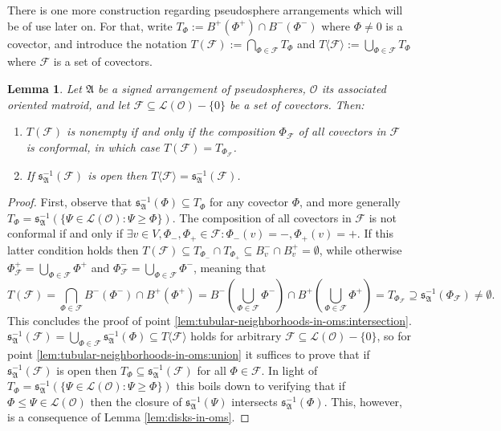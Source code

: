 \documentclass[a4paper,11pt,reqno, english]{amsart}
\newtheorem{lemma}[theorem]{Lemma}
\theoremstyle{definition}
\theoremstyle{remark}
\begin{document}
There is one more construction regarding pseudosphere arrangements which will be of use later on. For that, write $T_\Phi:=B^+(\Phi^+)\cap B^-(\Phi^-)$ where $\Phi\neq 0$ is a covector, and introduce the notation $T(\mathscr{F}):=\bigcap_{\Phi\in\mathscr{F}}T_\Phi$ and $T\langle\mathscr{F}\rangle:=\bigcup_{\Phi\in\mathscr{F}}T_\Phi$ where $\mathscr{F}$ is a set of covectors.
\begin{lemma}\label{lem:tubular-neighborhoods-in-oms}
    Let $\mathfrak{A}$ be a signed arrangement of pseudospheres, $\mathscr{O}$ its associated oriented matroid, and let $\mathscr{F}\subseteq\mathscr{L}(\mathscr{O})-\{0\}$ be a set of covectors. Then:
    \begin{enumerate}[label=\normalfont{(\arabic*)}]
        \item\label{lem:tubular-neighborhoods-in-oms:intersection} $T(\mathscr{F})$ is nonempty if and only if the composition $\Phi_\mathscr{F}$ of all covectors in $\mathscr{F}$ is conformal, in which case $T(\mathscr{F})=T_{\Phi_\mathscr{F}}$.
        \item\label{lem:tubular-neighborhoods-in-oms:union} If $\mathfrak{s}_\mathfrak{A}^{-1}(\mathscr{F})$ is open then $T\langle \mathscr{F}\rangle=\mathfrak{s}_\mathfrak{A}^{-1}(\mathscr{F})$.
    \end{enumerate} 
\end{lemma}
\begin{proof}
    First, observe that $\mathfrak{s}_\mathfrak{A}^{-1}(\Phi)\subseteq T_\Phi$ for any covector $\Phi$, and more generally $T_\Phi=\mathfrak{s}_\mathfrak{A}^{-1}(\{\Psi\in\mathscr{L}(\mathscr{O}):\Psi\geq\Phi\})$. The composition of all covectors in $\mathscr{F}$ is not conformal if and only if $\exists v\in V, \Phi_-,\Phi_+\in\mathscr{F}\colon\Phi_-(v)=-,\Phi_+(v)=+$. If this latter condition holds then $T(\mathscr{F})\subseteq T_{\Phi_-}\cap T_{\Phi_+}\subseteq B^-_v\cap B^+_v=\emptyset$, while otherwise $\Phi_\mathscr{F}^+=\bigcup_{\Phi\in\mathscr{F}}\Phi^+$ and $\Phi_\mathscr{F}^-=\bigcup_{\Phi\in\mathscr{F}}\Phi^-$, meaning that 
    \[
        T(\mathscr{F})=\bigcap_{\Phi\in\mathscr{F}}B^-(\Phi^-)\cap B^+(\Phi^+)=B^-(\bigcup_{\Phi\in\mathscr{F}}\Phi^-)\cap B^+(\bigcup_{\Phi\in\mathscr{F}}\Phi^+)=T_{\Phi_{\mathscr{F}}}\supseteq\mathfrak{s}_\mathfrak{A}^{-1}(\Phi_{\mathscr{F}})\neq\emptyset.
    \]
    This concludes the proof of point \ref{lem:tubular-neighborhoods-in-oms:intersection}. $\mathfrak{s}_\mathfrak{A}^{-1}(\mathscr{F})=\bigcup_{\Phi\in\mathscr{F}}\mathfrak{s}_\mathfrak{A}^{-1}(\Phi)\subseteq T\langle\mathscr{F}\rangle$ holds for arbitrary $\mathscr{F}\subseteq\mathscr{L}(\mathscr{O})-\{0\}$, so for point \ref{lem:tubular-neighborhoods-in-oms:union} it suffices to prove that if $\mathfrak{s}_\mathfrak{A}^{-1}(\mathscr{F})$ is open then $T_\Phi\subseteq\mathfrak{s}_\mathfrak{A}^{-1}(\mathscr{F})$ for all $\Phi\in\mathscr{F}$. In light of $T_\Phi=\mathfrak{s}_\mathfrak{A}^{-1}(\{\Psi\in\mathscr{L}(\mathscr{O}):\Psi\geq\Phi\})$ this boils down to verifying that if $\Phi\leq\Psi\in\mathscr{L}(\mathscr{O})$ then the closure of $\mathfrak{s}_\mathfrak{A}^{-1}(\Psi)$ intersects $\mathfrak{s}_\mathfrak{A}^{-1}(\Phi)$. This, however, is a consequence of Lemma \ref{lem:disks-in-oms}.
\end{proof}
\end{document}

